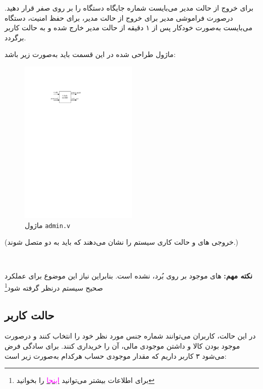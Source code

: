 \documentclass[]{article}
\begin{document}
برای خروج از حالت مدیر می‌بایست شماره جایگاه‌ دستگاه را بر روی صفر قرار دهید. درصورت فراموشی مدیر برای خروج از حالت مدیر، برای حفظ امنیت، دستگاه می‌بایست به‌صورت خودکار پس از ۱ دقیقه از حالت مدیر خارج شده و به حالت کاربر برگردد.



ماژول طراحی شده در این قسمت باید به‌صورت زیر باشد:


\begin{figure}[h]
	\centering
	\includegraphics[width=0.5\textwidth]{images/admin.pdf}
	\caption{ماژول \texttt{admin.v}}
	\label{ماژول admin.v}
\end{figure}

 (خروجی های  و  حالت کاری سیستم را نشان می‌دهند که باید به دو  متصل شوند.)



\newpage
\Large \textbf{\\
}


\textbf{نکته مهم:}  های موجود بر روی بُرد،  نشده است. بنابراین نیاز این موضوع برای عملکرد صحیح سیستم درنظر گرفته شود\footnote{برای اطلاعات بیشتر می‌توانید \href{https://www.geeksforgeeks.org/switch-debounce-in-digital-circuits/}{\textcolor{magenta}{اینجا}} را بخوانید}




\subsection*{{\titr حالت کاربر}} 
در این حالت، کاربران می‌توانند شماره جنس مورد نظر خود را انتخاب کنند و درصورت موجود بودن کالا و داشتن موجودی مالی، آن را خریداری کنند. برای سادگی فرض می‌شود ۳ کاربر داریم که مقدار موجودی حساب هرکدام به‌صورت زیر است:
\end{document}
